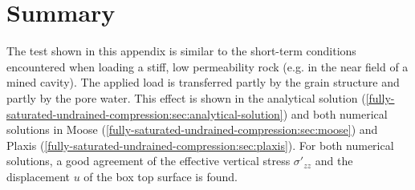 \section{Summary}
\label{fully-saturated-undrained-compression:sec:summary}

The test shown in this appendix is similar to the short-term conditions
encountered when loading a stiff, low permeability rock (e.g. in the near field
of a mined cavity). The applied load is transferred partly by the grain
structure and partly by the pore water. This effect is shown in the analytical
solution
(\autoref{fully-saturated-undrained-compression:sec:analytical-solution}) and
both numerical solutions in Moose
(\autoref{fully-saturated-undrained-compression:sec:moose}) and Plaxis
(\autoref{fully-saturated-undrained-compression:sec:plaxis}). For both
numerical solutions, a good agreement of the effective vertical stress
$\sigma'_{zz}$ and the displacement $u$ of the box top surface is found.

